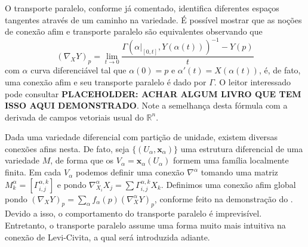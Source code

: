 O transporte paralelo, conforme já comentado, identifica diferentes espaços tangentes através de um caminho na variedade. É possível mostrar que as noções de conexão afim e transporte paralelo são equivalentes observando que
\begin{equation*}
    (\nabla_XY)_{p}=\lim_{ t \to 0 } \frac{\Gamma(\alpha|_{[0,t]},Y(\alpha(t)))^{-1}-Y(p)}{t}
\end{equation*}
com $\alpha$ curva diferenciável tal que $\alpha(0)=p$ e $\alpha'(t)=X(\alpha(t))$, é, de fato, uma conexão afim e seu transporte paralelo é dado por $\Gamma$. O leitor interessado pode consultar \textbf{PLACEHOLDER: ACHAR ALGUM LIVRO QUE TEM ISSO AQUI DEMONSTRADO}.
Note a semelhança desta fórmula com a derivada de campos vetoriais usual do $\mathbb{R}^{n}$.

Dada uma variedade diferencial com partição de unidade, existem diversas conexões afins nesta. De fato, seja $\{ (U_{\alpha}, \mathbf{x}_{\alpha}) \}$ uma estrutura diferencial de uma variedade $M$, de forma que os $V_{\alpha}=\mathbf{x}_{\alpha}(U_{\alpha})$ formem uma família localmente finita. Em cada $V_{\alpha}$ podemos definir uma conexão $\nabla^{\alpha}$ tomando uma matriz $M^{\alpha}_{k}=[\Gamma_{i,j}^{\alpha,k}]$ e pondo $\nabla^{\alpha}_{X_{i}}X_{j}=\sum\Gamma_{i,j}^{\alpha,k}X_{k}$. Definimos uma conexão afim global pondo $(\nabla_{X}Y)_{p}=\sum_{\alpha}f_{\alpha}(p)(\nabla_{X}^{\alpha}Y)_{p}$, conforme feito na demonstração do . Devido a isso, o comportamento do transporte paralelo é imprevisível. Entretanto, o transporte paralelo assume uma forma muito mais intuitiva na conexão de Levi-Civita, a qual será introduzida adiante.

